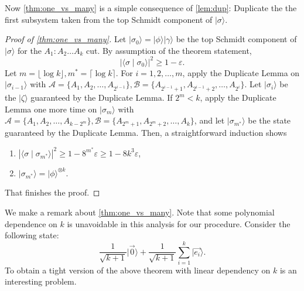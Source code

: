 \documentclass[10pt,a4paper]{article}
\newtheorem{lemma}[theorem]{Lemma}
\theoremstyle{remark}
\def\epsilon{\varepsilon}
\newcommand{\cA}{\mathcal{A}}
\newcommand{\cB}{\mathcal{B}}
\newcommand{\1}[1]{\mathds{1}{[#1]}}
\newcommand{\ket}[1]{\lvert #1\rangle}
\DeclareMathOperator*{\Exp}{\mathbb{E}}
\numberwithin{equation}{section}
\begin{document}
Now \cref{thm:one_vs_many} is a simple consequence of \cref{lem:dup}: Duplicate the the first subsystem taken from the top Schmidt component of $\ket\sigma$.
\begin{proof}[Proof of \emph{\cref{thm:one_vs_many}}]
Let $\ket{\sigma_0}=\ket\phi\ket\gamma$ be the top Schmidt component of $\ket\sigma$ for the $A_1: A_2\ldots A_k$ cut. By assumption of the theorem statement,
\[
    |\langle \sigma \mid \sigma_0\rangle|^2 \ge 1-\epsilon.
\]
Let $m =\lfloor \log k \rfloor, m^* = \lceil \log k \rceil$. For $i = 1, 2, \ldots, m$, apply the Duplicate Lemma on $\ket{\sigma_{i-1}}$ with $\cA = \{A_1,A_2,\ldots, A_{2^{i-1}}\}, \cB=\{A_{2^{i-1}+1}, A_{2^{i-1}+2},\ldots, A_{2^i}\}$. Let $\ket{\sigma_i}$ be the $\ket\zeta$ guaranteed by the Duplicate Lemma. 
If $2^m < k$, apply the Duplicate Lemma one more time on $\ket{\sigma_m}$ with $\cA=\{A_1, A_2,\ldots, A_{k - 2^m}\}, \cB=\{A_{2^m+1}, A_{2^m+2}, \ldots, A_k\}$, and let $\ket{\sigma_{m^*}}$ be the state guaranteed by the Duplicate Lemma. 
Then, a straightforward induction shows
\begin{enumerate}
    \item  $|\langle \sigma \mid \sigma_{m^*}\rangle|^2 \ge 1 - 8^{m^*}\epsilon\ge 1-8k^3\epsilon$,
    \item  $\ket{\sigma_{m^*}}=\ket\phi^{\otimes k}$.
\end{enumerate}
That finishes the proof.
\end{proof}


We make a remark about \cref{thm:one_vs_many}. Note that some polynomial dependence on $k$ is unavoidable in this analysis for our procedure. Consider the following state:
\[
    \frac{1}{\sqrt {k+1}}\ket{\vec0}+\frac{1}{\sqrt {k+1}}\sum_{i=1}^{k}\ket{\vec{e_i}}. 
\]
To obtain a tight version of the above theorem with linear dependency on $k$ is an interesting problem.

\end{document}
